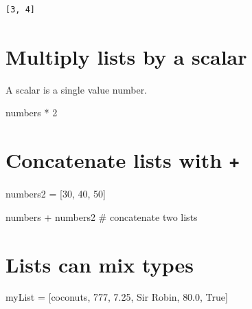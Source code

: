 \documentclass[
  letterpaper,
  DIV=11,
  numbers=noendperiod]{scrreprt}
\newenvironment{Shaded}{\begin{snugshade}}{\end{snugshade}}
\newcommand{\CommentTok}[1]{\textcolor[rgb]{0.37,0.37,0.37}{#1}}
\newcommand{\DecValTok}[1]{\textcolor[rgb]{0.68,0.00,0.00}{#1}}
\newcommand{\FloatTok}[1]{\textcolor[rgb]{0.68,0.00,0.00}{#1}}
\newcommand{\NormalTok}[1]{\textcolor[rgb]{0.00,0.23,0.31}{#1}}
\newcommand{\OperatorTok}[1]{\textcolor[rgb]{0.37,0.37,0.37}{#1}}
\newcommand{\StringTok}[1]{\textcolor[rgb]{0.13,0.47,0.30}{#1}}
\newcommand{\VariableTok}[1]{\textcolor[rgb]{0.07,0.07,0.07}{#1}}
\begin{document}
\begin{verbatim}
[3, 4]
\end{verbatim}

\hypertarget{multiply-lists-by-a-scalar-1}{%
\section{Multiply lists by a
scalar}\label{multiply-lists-by-a-scalar-1}}

A scalar is a single value number.

\begin{Shaded}
\begin{Highlighting}[]
\NormalTok{numbers }\OperatorTok{*} \DecValTok{2}
\end{Highlighting}
\end{Shaded}

\hypertarget{concatenate-lists-with-1}{%
\section{\texorpdfstring{Concatenate lists with
\texttt{+}}{Concatenate lists with +}}\label{concatenate-lists-with-1}}

\begin{Shaded}
\begin{Highlighting}[]
\NormalTok{numbers2 }\OperatorTok{=}\NormalTok{ [}\DecValTok{30}\NormalTok{, }\DecValTok{40}\NormalTok{, }\DecValTok{50}\NormalTok{]}
\end{Highlighting}
\end{Shaded}

\begin{Shaded}
\begin{Highlighting}[]
\NormalTok{numbers }\OperatorTok{+}\NormalTok{ numbers2 }\CommentTok{\# concatenate two lists}
\end{Highlighting}
\end{Shaded}

\hypertarget{lists-can-mix-types-1}{%
\section{Lists can mix types}\label{lists-can-mix-types-1}}

\begin{Shaded}
\begin{Highlighting}[]
\NormalTok{myList }\OperatorTok{=}\NormalTok{ [}\StringTok{\textquotesingle{}coconuts\textquotesingle{}}\NormalTok{, }\DecValTok{777}\NormalTok{, }\FloatTok{7.25}\NormalTok{, }\StringTok{\textquotesingle{}Sir Robin\textquotesingle{}}\NormalTok{, }\FloatTok{80.0}\NormalTok{, }\VariableTok{True}\NormalTok{]}
\end{Highlighting}
\end{Shaded}
\end{document}
